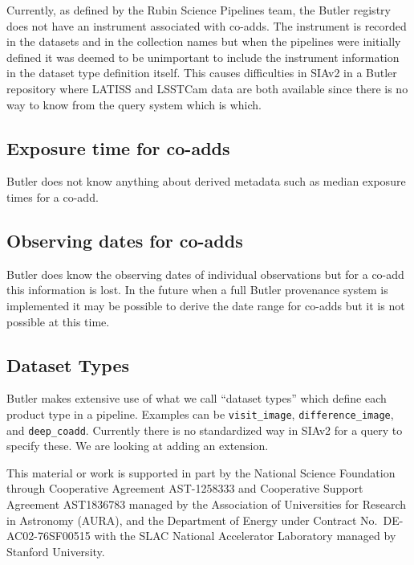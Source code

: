 \documentclass[11pt,twoside]{article}
\begin{document}
Currently, as defined by the Rubin Science Pipelines team, the Butler registry does not have an instrument associated with co-adds. The instrument is recorded in the datasets and in the collection names but when the pipelines were initially defined it was deemed to be unimportant to include the instrument information in the dataset type definition itself. This causes difficulties in SIAv2 in a Butler repository where LATISS and LSSTCam data are both available since there is no way to know from the query system which is which.

\subsection{Exposure time for co-adds}

Butler does not know anything about derived metadata such as median exposure times for a co-add.

\subsection{Observing dates for co-adds}

Butler does know the observing dates of individual observations but for a co-add this information is lost. In the future when a full Butler provenance system is implemented it may be possible to derive the date range for co-adds but it is not possible at this time.

\subsection{Dataset Types}

Butler makes extensive use of what we call ``dataset types'' which define each product type in a pipeline. Examples can be \texttt{visit\_image}, \texttt{difference\_image}, and \texttt{deep\_coadd}.
Currently there is no standardized way in SIAv2 for a query to specify these.
We are looking at adding an extension.


\acknowledgments This material or work is supported in part by the National Science Foundation through Cooperative Agreement AST-1258333 and Cooperative Support Agreement AST1836783 managed by the Association of Universities for Research in Astronomy (AURA), and the Department of Energy under Contract No.\ DE-AC02-76SF00515 with the SLAC National Accelerator Laboratory managed by Stanford University.


\end{document}
